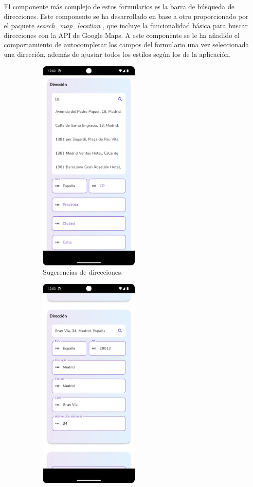\documentclass[a4paper, 12pt]{article}
\begin{document}
El componente más complejo de estos formularios es la barra de búsqueda de direcciones. Este componente se ha desarrollado en base a otro proporcionado por el paquete \textit{search\_map\_location} \cite{search_map_location}, que incluye la funcionalidad básica para buscar direcciones con la API de Google Maps. A este componente se le ha añadido el comportamiento de autocompletar los campos del formulario una vez seleccionada una dirección, además de ajustar todos los estilos según los de la aplicación.

\begin{figure}[H]
   	\begin{subfigure}{0.48\textwidth}
		\begin{center}
			{\includegraphics[width=5cm]{app/AddressSearcherOnSearch.png}\par}
			\caption{Sugerencias de direcciones.}
		\end{center}  
	\end{subfigure}\hfill
   	\begin{subfigure}{0.48\textwidth}
		\begin{center}
			{\includegraphics[width=5cm]{app/AddressSearcherAutoComplete.png}\par}

\end{center}
\end{subfigure}
\end{figure}
\end{document}
